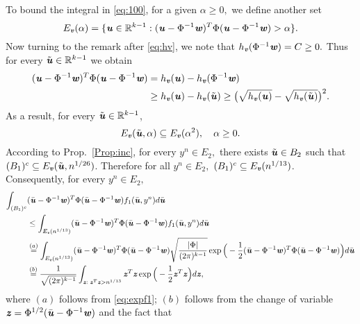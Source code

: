 \documentclass[11pt,onecolumn]{IEEEtran}
\newcounter{remark}[section]
\def\mathbi#1{{\textbf{\textit #1}}}
\begin{document}
To bound the integral in \eqref{eq:100}, for a given $\alpha \ge 0,$ we define another set
$$
E_{\mathbi{v}}(\alpha) = \{\mathbi{u} \in \mathbb{R}^{k-1}: (\mathbi{u}- \Phi^{-1}\mathbi{w} )^T \Phi  (\mathbi{u}- \Phi^{-1}\mathbi{w} ) >  \alpha \}.
$$
Now turning to the remark after \eqref{eq:hv}, we note that $h_{\mathbi{v}}(\Phi^{-1}\mathbi{w})=C\ge0.$ Thus for 
every $\tilde{\mathbi{u}} \in \mathbb{R}^{k-1}$ we obtain
\begin{align*}
(\mathbi{u}- \Phi^{-1}\mathbi{w} )^T \Phi  (\mathbi{u}- \Phi^{-1}\mathbi{w} ) 
& = h_{\mathbi{v}}(\mathbi{u}) - h_{\mathbi{v}}(\Phi^{-1}\mathbi{w}) \\
& \ge h_{\mathbi{v}}(\mathbi{u}) - h_{\mathbi{v}}(\tilde{\mathbi{u}}) 
\ge \big( \sqrt{h_{\mathbi{v}}(\mathbi{u}) } - \sqrt{ h_{\mathbi{v}}(\tilde{\mathbi{u}}) }  \big)^2.
\end{align*}
As a result, for every $\tilde{\mathbi{u}} \in \mathbb{R}^{k-1}$,
$$
E_{\mathbi{v}}(\tilde{\mathbi{u}}, \alpha) \subseteq E_{\mathbi{v}}(\alpha^2) 
, \quad\alpha \ge 0.
$$
According to Prop.~\ref{Prop:inc}, for every $y^n \in E_2,$ there exists $\tilde{\mathbi{u}} \in B_2$ such that
$(B_1)^c \subseteq E_{\mathbi{v}}(\tilde{\mathbi{u}}, n^{1/26})$.
Therefore  for all $y^n \in E_2,$ $(B_1)^c \subseteq E_{\mathbi{v}}( n^{1/13 })$.
Consequently, for every $y^n \in E_2,$
      \begin{align}
 \int_{(B_1)^c} &(\bar{\mathbi{u}} - \Phi^{-1}\mathbi{w})^T  \Phi
(\bar{\mathbi{u}} - \Phi^{-1}\mathbi{w}) f_1(\bar{\mathbi{u}},y^n) d\bar{\mathbi{u}} \nonumber\\
&\le  \int_{E_{\mathbi{v}}( n^{1/13 }) } (\bar{\mathbi{u}} - \Phi^{-1}\mathbi{w})^T  \Phi
(\bar{\mathbi{u}} - \Phi^{-1}\mathbi{w}) f_1(\bar{\mathbi{u}},y^n) d\bar{\mathbi{u}}  \nonumber\\
&\overset{(a)}{=}   \int_{E_{\mathbi{v}}( n^{1/13 }) } (\bar{\mathbi{u}} - \Phi^{-1}\mathbi{w})^T  \Phi
(\bar{\mathbi{u}} - \Phi^{-1}\mathbi{w})  \sqrt{\frac{{|\Phi|}}{{(2\pi)^{k-1}}}}
 \exp\Big( - \frac{1}{2} (\bar{\mathbi{u}} - \Phi^{-1}\mathbi{w})^T \Phi (\bar{\mathbi{u}} - \Phi^{-1}\mathbi{w})  \Big) d\bar{\mathbi{u}} \nonumber \\
&\overset{(b)}{=}  \frac{1}{\sqrt{(2\pi)^{k-1}}}\int_{\mathbi{z}: \;\mathbi{z}^T \mathbi{z} > n^{1/13 } }  \mathbi{z}^T \mathbi{z} 
 \exp\Big( - \frac{1}{2} \mathbi{z}^T \mathbi{z} \Big) d\mathbi{z},\label{eq:p2}
       \end{align}
where $(a)$ follows from \eqref{eq:expf1}; $(b)$ follows from the change of variable 
$\mathbi{z} = \Phi^{1/2}(\bar{\mathbi{u}} - \Phi^{-1}\mathbi{w})$ and the fact that 
\end{document}
